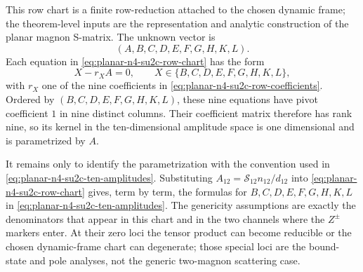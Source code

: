 This row chart is a finite row-reduction attached to the chosen dynamic frame;
the theorem-level inputs are the representation and analytic construction of
the planar magnon S-matrix.  The unknown vector is
\[
  (A,B,C,D,E,F,G,H,K,L).
\]
Each equation in \eqref{eq:planar-n4-su2c-row-chart} has the form
\[
  X-r_XA=0,\qquad X\in\{B,C,D,E,F,G,H,K,L\},
\]
with \(r_X\) one of the nine coefficients in
\eqref{eq:planar-n4-su2c-row-coefficients}.  Ordered by
\((B,C,D,E,F,G,H,K,L)\), these nine equations have pivot coefficient \(1\)
in nine distinct columns.  Their coefficient matrix therefore has rank
nine, so its kernel in the ten-dimensional amplitude space is one
dimensional and is parametrized by \(A\).

It remains only to identify the parametrization with the convention used in
\eqref{eq:planar-n4-su2c-ten-amplitudes}.  Substituting
\(A_{12}=\mathcal S_{12}n_{12}/d_{12}\) into
\eqref{eq:planar-n4-su2c-row-chart} gives, term by term, the formulas for
\(B,C,D,E,F,G,H,K,L\) in
\eqref{eq:planar-n4-su2c-ten-amplitudes}.  The genericity assumptions are
exactly the denominators that appear in this chart and in the two channels
where the \(Z^\pm\) markers enter.  At their zero loci the tensor product can
become reducible or the chosen dynamic-frame chart can degenerate; those
special loci are the bound-state and pole analyses, not the generic
two-magnon scattering case.


